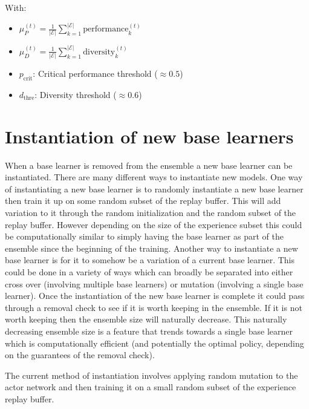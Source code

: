 With:
\begin{itemize}
    \item $\mu_P^{(t)} = \frac{1}{|\mathcal{E}|} \sum_{k=1}^{|\mathcal{E}|} \text{performance}_k^{(t)}$
    \item $\mu_D^{(t)} = \frac{1}{|\mathcal{E}|} \sum_{k=1}^{|\mathcal{E}|} \text{diversity}_k^{(t)}$
    \item $p_{\text{crit}}$: Critical performance threshold ($\approx 0.5$)
    \item $d_{\text{thre}}$: Diversity threshold ($\approx 0.6$)
\end{itemize}



\section{Instantiation of new base learners}

When a base learner is removed from the ensemble a new base learner can be instantiated. There are many different ways to instantiate new models. One way of instantiating a new base learner is to randomly instantiate a new base learner then train it up on some random subset of the replay buffer. This will add variation to it through the random initialization and the random subset of the replay buffer. However depending on the size of the experience subset this could be computationally similar to simply having the base learner as part of the ensemble since the beginning of the training. Another way to instantiate a new base learner is for it to somehow be a variation of a current base learner. This could be done in a variety of ways which can broadly be separated into either cross over (involving multiple base learners) or mutation (involving a single base learner). Once the instantiation of the new base learner is complete it could pass through a removal check to see if it is worth keeping in the ensemble. If it is not worth keeping then the ensemble size will naturally decrease. This naturally decreasing ensemble size is a feature that trends towards a single base learner which is computationally efficient (and potentially the optimal policy, depending on the guarantees of the removal check).

The current method of instantiation involves applying random mutation to the actor network and then training it on a small random subset of the experience replay buffer.

